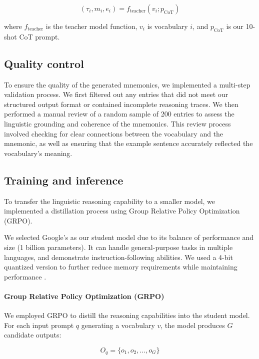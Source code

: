 \begin{equation}
(\tau_i, m_i, e_i) = f_{\text{teacher}}(v_i; p_{\text{CoT}})
\end{equation}

where $f_{\text{teacher}}$ is the teacher model function, $v_i$ is vocabulary $i$, and $p_{\text{CoT}}$ is our 10-shot CoT prompt.

\subsection{Quality control} To ensure the quality of the generated mnemonics, we implemented a multi-step validation process. We first filtered out any entries that did not meet our structured output format or contained incomplete reasoning traces. We then performed a manual review of a random sample of 200 entries to assess the linguistic grounding and coherence of the mnemonics. This review process involved checking for clear connections between the vocabulary and the mnemonic, as well as ensuring that the example sentence accurately reflected the vocabulary's meaning.

\subsection{Training and inference} \label{sec:training-inference}
To transfer the linguistic reasoning capability to a smaller model, we implemented a distillation process using Group Relative Policy Optimization (GRPO).

We selected Google's \studentmodel \citep{gemma-teamGemma3Technical2025} as our student model due to its balance of performance and size (1 billion parameters). It can handle general-purpose tasks in multiple languages, and demonstrate instruction-following abilities. We used a 4-bit quantized version to further reduce memory requirements while maintaining performance \citep{dettmersQLoRAEfficientFinetuning2023}.

\paragraph*{Group Relative Policy Optimization (GRPO)} We employed GRPO \citep{DeepSeek-AIDEEPSEEKR12025} to distill the reasoning capabilities into the student model. For each input prompt $q$ generating a vocabulary $v$, the model produces $G$ candidate outputs:

\begin{equation}
O_q = \{o_1, o_2, \ldots, o_G\}
\end{equation}

